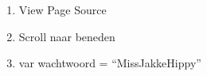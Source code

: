 \begin{enumerate}
  \item View Page Source
  \item Scroll naar beneden
  \item var wachtwoord = ``MissJakkeHippy''
\end{enumerate}